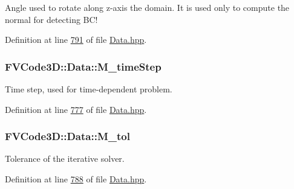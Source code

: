 Angle used to rotate along z-\/axis the domain. It is used only to compute the normal for detecting B\+C! 



Definition at line \hyperlink{Data_8hpp_source_l00791}{791} of file \hyperlink{Data_8hpp_source}{Data.\+hpp}.

\subsubsection[{\texorpdfstring{M\+\_\+time\+Step}{M_timeStep}}]{ F\+V\+Code3\+D\+::\+Data\+::\+M\+\_\+time\+Step\hspace{0.3cm}{\ttfamily [protected]}}\hypertarget{classFVCode3D_1_1Data_a10e4abb864d8f95f89fd468a2a328d45}{}\label{classFVCode3D_1_1Data_a10e4abb864d8f95f89fd468a2a328d45}


Time step, used for time-\/dependent problem. 



Definition at line \hyperlink{Data_8hpp_source_l00777}{777} of file \hyperlink{Data_8hpp_source}{Data.\+hpp}.

\subsubsection[{\texorpdfstring{M\+\_\+tol}{M_tol}}]{ F\+V\+Code3\+D\+::\+Data\+::\+M\+\_\+tol\hspace{0.3cm}{\ttfamily [protected]}}\hypertarget{classFVCode3D_1_1Data_a00dd1282e39bfdf77368f3c79382c5c4}{}\label{classFVCode3D_1_1Data_a00dd1282e39bfdf77368f3c79382c5c4}


Tolerance of the iterative solver. 



Definition at line \hyperlink{Data_8hpp_source_l00788}{788} of file \hyperlink{Data_8hpp_source}{Data.\+hpp}.

